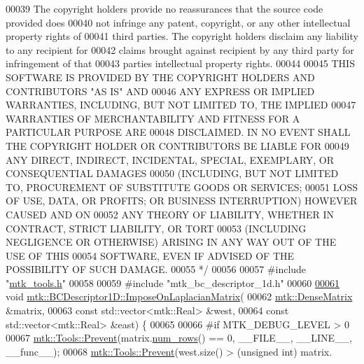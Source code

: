 \begin{DoxyCode}
00039 \textcolor{comment}{The copyright holders provide no reassurances that the source code provided does}
00040 \textcolor{comment}{not infringe any patent, copyright, or any other intellectual property rights of}
00041 \textcolor{comment}{third parties. The copyright holders disclaim any liability to any recipient for}
00042 \textcolor{comment}{claims brought against recipient by any third party for infringement of that}
00043 \textcolor{comment}{parties intellectual property rights.}
00044 \textcolor{comment}{}
00045 \textcolor{comment}{THIS SOFTWARE IS PROVIDED BY THE COPYRIGHT HOLDERS AND CONTRIBUTORS "AS IS" AND}
00046 \textcolor{comment}{ANY EXPRESS OR IMPLIED WARRANTIES, INCLUDING, BUT NOT LIMITED TO, THE IMPLIED}
00047 \textcolor{comment}{WARRANTIES OF MERCHANTABILITY AND FITNESS FOR A PARTICULAR PURPOSE ARE}
00048 \textcolor{comment}{DISCLAIMED. IN NO EVENT SHALL THE COPYRIGHT HOLDER OR CONTRIBUTORS BE LIABLE FOR}
00049 \textcolor{comment}{ANY DIRECT, INDIRECT, INCIDENTAL, SPECIAL, EXEMPLARY, OR CONSEQUENTIAL DAMAGES}
00050 \textcolor{comment}{(INCLUDING, BUT NOT LIMITED TO, PROCUREMENT OF SUBSTITUTE GOODS OR SERVICES;}
00051 \textcolor{comment}{LOSS OF USE, DATA, OR PROFITS; OR BUSINESS INTERRUPTION) HOWEVER CAUSED AND ON}
00052 \textcolor{comment}{ANY THEORY OF LIABILITY, WHETHER IN CONTRACT, STRICT LIABILITY, OR TORT}
00053 \textcolor{comment}{(INCLUDING NEGLIGENCE OR OTHERWISE) ARISING IN ANY WAY OUT OF THE USE OF THIS}
00054 \textcolor{comment}{SOFTWARE, EVEN IF ADVISED OF THE POSSIBILITY OF SUCH DAMAGE.}
00055 \textcolor{comment}{*/}
00056 
00057 \textcolor{preprocessor}{#include "\hyperlink{mtk__tools_8h}{mtk\_tools.h}"}
00058 
00059 \textcolor{preprocessor}{#include "mtk\_bc\_descriptor\_1d.h"}
00060 
\hypertarget{mtk__bc__descriptor__1d_8cc_source_l00061}{}\hyperlink{classmtk_1_1BCDescriptor1D_a33e51235eaa930e4470f027001a023cf}{00061} \textcolor{keywordtype}{void} \hyperlink{classmtk_1_1BCDescriptor1D_a33e51235eaa930e4470f027001a023cf}{mtk::BCDescriptor1D::ImposeOnLaplacianMatrix}(
00062     \hyperlink{classmtk_1_1DenseMatrix}{mtk::DenseMatrix} &matrix,
00063     \textcolor{keyword}{const} std::vector<mtk::Real> &west,
00064     \textcolor{keyword}{const} std::vector<mtk::Real> &east) \{
00065 
00066 \textcolor{preprocessor}{  #if MTK\_DEBUG\_LEVEL > 0}
00067   \hyperlink{classmtk_1_1Tools_a332324c6f25e66be9dff48c5987a3b9f}{mtk::Tools::Prevent}(matrix.\hyperlink{classmtk_1_1DenseMatrix_a53f3afb3b6a8d21854458aaa9663cc74}{num\_rows}() == 0, \_\_FILE\_\_, \_\_LINE\_\_, \_\_func\_\_);
00068   \hyperlink{classmtk_1_1Tools_a332324c6f25e66be9dff48c5987a3b9f}{mtk::Tools::Prevent}(west.size() > (\textcolor{keywordtype}{unsigned} int) matrix.

\end{DoxyCode}
